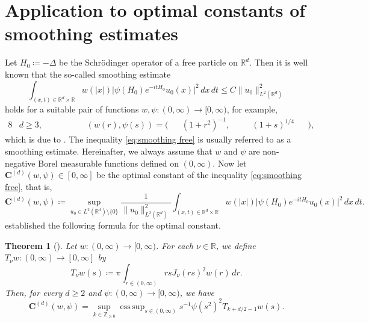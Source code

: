 \documentclass[reqno,letterpaper]{amsart}
\numberwithin{equation}{section}
\theoremstyle{plain}
\newtheorem{theorem}{Theorem}[section]
\newcommand{\R}{\mathbb{R}}
\newcommand{\Z}{\mathbb{Z}}
\newcommand{\abs}[1]{\lvert#1\rvert}
\newcommand{\norm}[1]{\lVert#1\rVert}
\newcommand{\Hamiltonian}{H}
\newcommand{\Hamiltonianfree}{\Hamiltonian_0}
\newcommand{\Laplacian}{\Delta}
\newcommand{\Tnu}[1]{T_{#1}}
\DeclareMathOperator*{\esssup}{ess\,sup}
\newcommand{\Const}{\bm{C}}
\newcommand{\Constwpd}[3]{\Const^{(#3)}(#1, #2)}
\newcommand{\BesselJ}[1]{J_{#1}}
\newcommand{\intervaloo}[2]{(#1, #2)}
\newcommand{\intervalco}[2]{[#1, #2)}
\newcommand{\intervalcc}[2]{[#1, #2]}
\begin{document}
	\section{Application to optimal constants of smoothing estimates} \label{section:application}
	Let $\Hamiltonianfree \coloneqq - \Laplacian$ be the Schr\"{o}dinger operator of a free particle on $\R^d$. Then it is well known that the so-called smoothing estimate
\begin{equation} \label{eq:smoothing free}
	\int_{(x, t) \in \R^d \times \R} w(\abs{x}) \abs{ \psi(\Hamiltonianfree) e^{- i t \Hamiltonianfree} u_0(x) }^2 \, dx \, dt \leq C \norm{u_0}_{L^2(\R^d)}^{2} 
\end{equation}
holds for a suitable pair of functions $w, \psi \colon \intervaloo{0}{\infty} \to \intervalco{0}{\infty}$, for example,
\begin{alignat}{8}
	&d \geq 3,  \quad && \quad && ( w(r), \psi(s) ) = ( &&(1+r^2)^{-1}, \quad&&(1+s)^{1/4} &&) ,
	\label{eq:type A} 
\end{alignat}
which is due to \citet[Theorem 2]{KY1989}. The inequality \eqref{eq:smoothing free} is usually referred to as a smoothing estimate.
Hereinafter, we always assume that $w$ and $\psi$ are non-negative Borel measurable functions defined on $\intervaloo{0}{\infty}$.
Now let $\Constwpd{w}{\psi}{d} \in \intervalcc{0}{\infty}$ be the optimal constant of the inequality \eqref{eq:smoothing free}, 
that is,
\begin{equation}
	\Constwpd{w}{\psi}{d} \coloneqq \sup_{u_0 \in L^2(\R^d) \setminus \{0\}} \frac{1}{\norm{u_0}_{L^2(\R^d)}^{2}} \int_{(x, t) \in \R^d \times \R} w(\abs{x}) \abs{ \psi(\Hamiltonianfree) e^{- i t \Hamiltonianfree} u_0(x) }^2 \, dx \, dt .
\end{equation}
\citet[Theorem 4.1]{Wal2002} established the following formula for the optimal constant. 
\begin{theorem}[{\cite[Theorem 4.1]{Wal2002}}] \label{thm:Walther}
	Let $w \colon \intervaloo{0}{\infty} \to \intervalco{0}{\infty}$.
	For each $\nu \in \R$, we define $\Tnu{\nu} w \colon \intervaloo{0}{\infty} \to \intervalcc{0}{\infty}$ by
	\begin{equation} \label{eq:Tnu}
		\Tnu{\nu}w(s) \coloneqq \pi \int_{r \in \intervaloo{0}{\infty}} r s \BesselJ{\nu}(rs)^2 w(r) \, dr .
	\end{equation}
	Then, for every $d \geq 2$ and $\psi \colon \intervaloo{0}{\infty} \to \intervalco{0}{\infty}$, we have
	\begin{equation} \label{eq:Walther}
		\Constwpd{w}{\psi}{d} = \sup_{k \in \Z_{\geq 0}} \esssup_{s \in \intervaloo{0}{\infty}} s^{-1} \psi(s^2)^2 \Tnu{k+d/2-1}w(s) .
	\end{equation}
\end{theorem}
\end{document}
